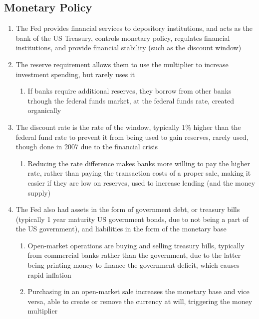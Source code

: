 \documentclass[11 pt, twoside]{article}
\begin{document}
\subsection{Monetary Policy}
\begin{enumerate}
\item The Fed provides financial services to depository institutions, and acts as the bank of the US Treasury, controls monetary policy, regulates financial institutions, and provide financial stability (such as the discount window)
\item The reserve requirement allows them to use the multiplier to increase investment spending, but rarely uses it
\begin{enumerate}
\item If banks require additional reserves, they borrow from other banks trhough the federal funds market, at the federal funds rate, created organically
\end{enumerate}
\item The discount rate is the rate of the window, typically 1\% higher than the federal fund rate to prevent it from being used to gain reserves, rarely used, though done in 2007 due to the financial crisis
\begin{enumerate}
\item Reducing the rate difference makes banks more willing to pay the higher rate, rather than paying the transaction costs of a proper sale, making it easier if they are low on reserves, used to increase lending (and the money supply)
\end{enumerate}
\item The Fed also had assets in the form of government debt, or treasury bills (typically 1 year maturity US government bonds, due to not being a part of the US government), and liabilities in the form of the monetary base
\begin{enumerate}
\item Open-market operations are buying and selling treasury bills, typically from commercial banks rather than the government, due to the latter being printing money to finance the government deficit, which causes rapid inflation
\item Purchasing in an open-market sale increases the monetary base and vice versa, able to create or remove the currency at will, triggering the money multiplier
\end{enumerate}
\end{enumerate}
\end{document}
